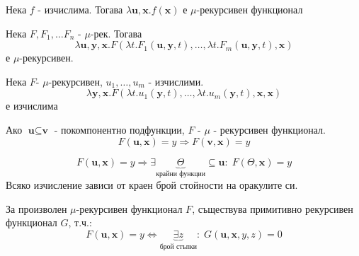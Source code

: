 \begin{corollary}
    Нека $f$ - изчислима. Тогава $\lambda \textbf{u}, \textbf{x}. f(\textbf{x})$ е $\mu$-рекурсивен функционал
\end{corollary}
\begin{corollary}
    Нека $F, F_1, \dots F_n$ - $\mu$-рек. Тогава 
    \begin{equation*}
        \lambda \textbf{u}, \textbf{y}, \textbf{x}. F(\lambda t. F_1(\textbf{u}, \textbf{y}, t), \dots, \lambda t. F_m(\textbf{u}, \textbf{y}, t), \textbf{x})
    \end{equation*}
    е $\mu$-рекурсивен.
\end{corollary}
\begin{corollary}
    Нека $F$- $\mu$-рекурсивен, $u_1, \dots, u_m$ - изчислими.
    \begin{equation*}
        \lambda \textbf{y}, \textbf{x}. F(\lambda t. u_1(\textbf{y}, t), \dots, \lambda t. u_m(\textbf{y}, t), \textbf{x}, \textbf{x})
    \end{equation*}
    е изчислима
\end{corollary}
\begin{corollary}[Монотонност]
    Ако $\textbf{u} \subseteq \textbf{v}$ - покомпонентно подфункции, $F$ - $\mu$ - рекурсивен функционал.
    \begin{equation*}
        F(\textbf{u}, \textbf{x}) = y \Rightarrow F(\textbf{v}, \textbf{x}) = y
    \end{equation*}
\end{corollary}
\begin{corollary}[Компактност]
    \begin{equation}
        F(\textbf{u}, \textbf{x}) = y \Rightarrow \exists \underbrace{\Theta}_{\text{крайни функции}} \subseteq \textbf{u}:\; F(\Theta, \textbf{x}) = y
    \end{equation}
    Всяко изчисление зависи от краен брой стойности на оракулите си.
\end{corollary}
\begin{proposition}
    За произволен $\mu$-рекурсивен функционал $F$, съществува примитивно рекурсивен функционал $G$, т.ч.:
    \begin{equation}
        F(\textbf{u}, \textbf{x}) = y \iff \underbrace{\exists z}_{\text{брой стъпки}}:\; G(\textbf{u}, \textbf{x}, y, z) = 0
    \end{equation}
\end{proposition}

